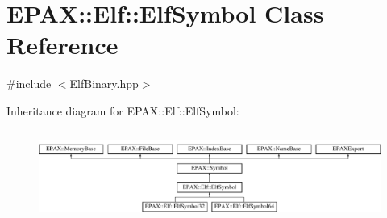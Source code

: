 \hypertarget{class_e_p_a_x_1_1_elf_1_1_elf_symbol}{\section{\-E\-P\-A\-X\-:\-:\-Elf\-:\-:\-Elf\-Symbol \-Class \-Reference}
\label{class_e_p_a_x_1_1_elf_1_1_elf_symbol}
}


{\ttfamily \#include $<$\-Elf\-Binary.\-hpp$>$}

\-Inheritance diagram for \-E\-P\-A\-X\-:\-:\-Elf\-:\-:\-Elf\-Symbol\-:\begin{figure}[H]
\begin{center}
\leavevmode
\includegraphics[height=2.966887cm]{class_e_p_a_x_1_1_elf_1_1_elf_symbol}
\end{center}
\end{figure}
